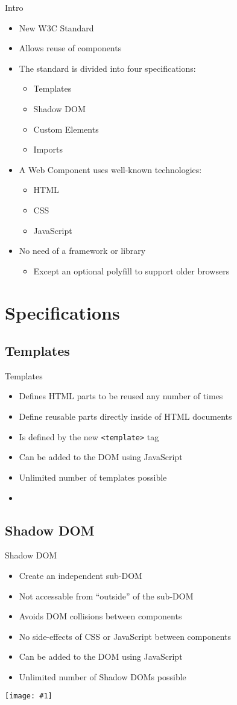 \documentclass{beamer}
\newcommand{\code}[1]{\texttt{#1}}
\newcommand{\listing}[1]{
	\begin{itemize}
		\item[]
	\end{itemize}
}
\newcommand{\myfig}[2]{
	\begin{minipage}[c]{\textwidth}
		\begin{center}
			\texttt{[image: \#1]}
		\end{center}
		\vspace{3mm}
	\end{minipage}
}
\newcommand{\slideItems}[1]{
	\begin{itemize}
		#1
	\end{itemize}
}
\newcommand{\slide}[2]{
	\begin{frame}{#1}
		#2
	\end{frame}
}
\begin{document}
\slide{Intro}{
	\slideItems{
		\item New W3C Standard
		\item Allows reuse of components
		\item The standard is divided into four specifications:
			\slideItems{
				\item Templates
				\item Shadow DOM
				\item Custom Elements
				\item Imports
			}
		\item A Web Component uses well-known technologies:
			\slideItems{
				\item HTML
				\item CSS
				\item JavaScript
			}
		\item No need of a framework or library
			\slideItems{
				\item Except an optional polyfill to support older browsers
			}
	}
}

\section{Specifications}

\subsection{Templates}

\slide{Templates}{
	\slideItems{
		\item Defines HTML parts to be reused any number of times
		\item Define reusable parts directly inside of HTML documents
		\item Is defined by the new \code{<template>} tag
		\item Can be added to the DOM using JavaScript
		\item Unlimited number of templates possible
	}
	\listing{template.html}
}

\subsection{Shadow DOM}

\slide{Shadow DOM}{
	\slideItems{
		\item Create an independent sub-DOM
		\item Not accessable from ``outside'' of the sub-DOM
		\item Avoids DOM collisions between components
		\item No side-effects of CSS or JavaScript between components
		\item Can be added to the DOM using JavaScript
		\item Unlimited number of Shadow DOMs possible
	}
	\myfig{shadow_dom.png}{.6}
}
\end{document}
